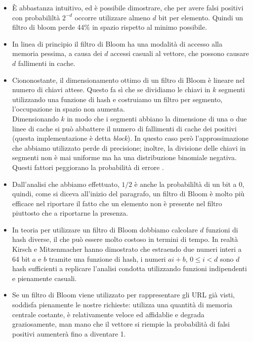 \begin{itemize}
    \item È abbastanza intuitivo, ed è possibile dimostrare, che per avere falsi positivi con probabililtà $2^{-d}$ occorre utilizzare almeno $d$ bit per elemento. Quindi un filtro di bloom perde 44\% in spazio rispetto al minimo possibile.
    \item In linea di principio il filtro di Bloom ha una modalità di accesso alla memoria pessima, a causa dei $d$ accessi casuali al vettore, che possono causare $d$ fallimenti in cache.
    \item Ciononostante, il dimensionamento ottimo di un filtro di Bloom è lineare nel numero di chiavi attese. Questo fa sì che se dividiamo le chiavi in $k$ segmenti utilizzando una funzione di hash e costruiamo un filtro per segmento, l'occupazione in spazio non aumenta.\\
    Dimensionando $k$ in modo che i segmenti abbiano la dimensione di una o due linee di cache si può abbattere il numero di fallimenti di cache dei positivi (questa implementazione è detta \textit{block}). In questo caso però l'approssimazione che abbiamo utilizzato perde di precisione; inoltre, la divisione delle chiavi in segmenti non è mai uniforme ma ha una distribuzione binomiale negativa. Questi fattori peggiorano la probabilità di errore \cite{Putze}.
    \item Dall'analisi che abbiamo effettuato, $1/2$ è anche la probabililtà di un bit a 0, quindi, come si diceva all'inizio del paragrafo, un filtro di Bloom è molto più efficace nel riportare il fatto che un elemento non è presente nel filtro piuttosto che a riportarne la presenza.
    \item In teoria per utilizzare un filtro di Bloom dobbiamo calcolare $d$ funzioni di hash diverse, il che può essere molto costoso in termini di tempo. In realtà Kirsch e Mitzenmacher hanno dimostrato che estraendo due numeri interi a 64 bit $a$ e $b$ tramite una funzione di hash, i numeri $ai + b$, $0 \leq i < d$ sono $d$ hash sufficienti a replicare l'analisi condotta utilizzando funzioni indipendenti e pienamente casuali.
    \item Se un filtro di Bloom viene utilizzato per rappresentare gli URL già visti, soddisfa pienamente le nostre richieste: utilizza una quantità di memoria centrale costante, è relativamente veloce ed affidablie e degrada graziosamente, man mano che il vettore si riempie la probabilità di falsi positivi aumenterà fino a diventare 1.
\end{itemize}
